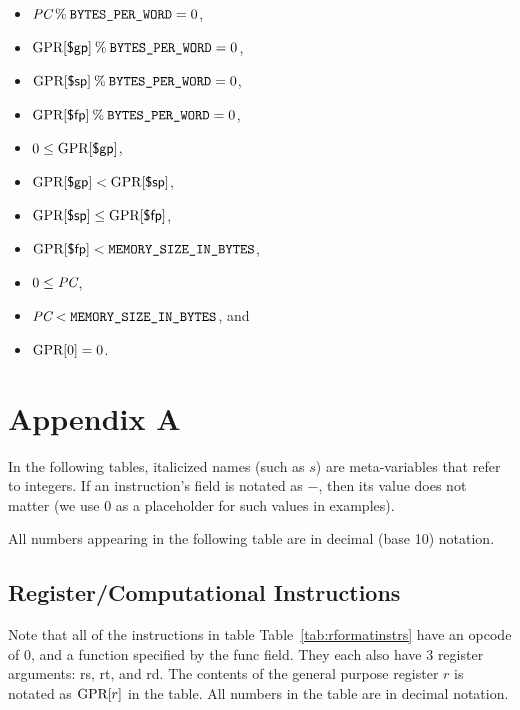 \documentclass[11pt,letterpaper]{article}
\newcommand{\tabref}[1]{Table~\ref{#1}}  %
\begin{document}
\newcommand{\BPW}{\mbox{\texttt{BYTES\_PER\_WORD}}}
\begin{itemize}
\item
  $\PC \MOD \BPW = 0$,

\item
  $\GPR{\GP} \MOD \BPW = 0$,

\item
  $\GPR{\SP} \MOD \BPW = 0$,

\item
  $\GPR{\FP} \MOD \BPW = 0$,

\item
  $0 \leq \textrm{GPR[}\textsf{\$gp}\textrm{]}$,

\item
  $\textrm{GPR[}\textsf{\$gp}\textrm{]} < \textrm{GPR[}\textsf{\$sp}\textrm{]}$,

\item
  $\textrm{GPR[}\textsf{\$sp}\textrm{]} \leq \textrm{GPR[}\textsf{\$fp}\textrm{]}$,

\item
  $\textrm{GPR[}\textsf{\$fp}\textrm{]} < \mbox{\texttt{MEMORY\_SIZE\_IN\_BYTES}}$,
   
\item
  $0 \leq \textit{PC}$, 

\item
  $\textit{PC} < \mbox{\texttt{MEMORY\_SIZE\_IN\_BYTES}}$, and

\item
  $\textrm{GPR[}0\textrm{]} = 0$.
\end{itemize}

\appendix
\section{Appendix A}
\label{appsec:A}

In the following tables, italicized names (such as $s$) are
meta-variables that refer to integers.
If an instruction's field is
notated as $-$, then its value does not matter (we use $0$ as a
placeholder for such values in examples).

All numbers appearing in the following table are in decimal (base 10) notation.

\subsection{Register/Computational Instructions}

Note that all of the instructions in table \tabref{tab:rformatinstrs}
have an opcode of $0$,
and a function specified by the func field. They each also have 3 register
arguments: rs, rt, and rd.
The contents of the general purpose register $r$ is
notated as $\textrm{GPR[}r\textrm{]}$ in the table.
All numbers in the table are in decimal notation.
\end{document}
